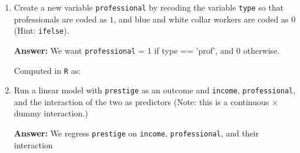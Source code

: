 \documentclass[12pt,letterpaper]{article}
\begin{document}
\newpage
\begin{enumerate}
	
	\item [(a)]
	Create a new variable \texttt{professional} by recoding the variable \texttt{type} so that professionals are coded as $1$, and blue and white collar workers are coded as $0$ (Hint: \texttt{ifelse}).
	
	\textbf{Answer:}
	We want \texttt{professional} = 1 if type == 'prof', and 0 otherwise.
	
	\vspace{1em}
	Computed in \texttt{R} as:
	 
	
	
	\item [(b)]
	Run a linear model with \texttt{prestige} as an outcome and \texttt{income}, \texttt{professional}, and the interaction of the two as predictors (Note: this is a continuous $\times$ dummy interaction.)
	
	\textbf{Answer:}
	We regress \texttt{prestige} on \texttt{income}, \texttt{professional}, and their interaction
	

\end{enumerate}
\end{document}
